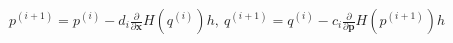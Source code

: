 \documentclass[preview]{standalone}
\begin{document}
\begin{align*}
p^{(i+1)}=p^{(i)}-d_i\frac{\partial}{\partial\mathbf x}H(q^{(i)})h , \  q^{(i+1)}=q^{(i)}-c_i\frac{\partial}{\partial\mathbf p}H(p^{(i+1)})h
\end{align*}
\end{document}
